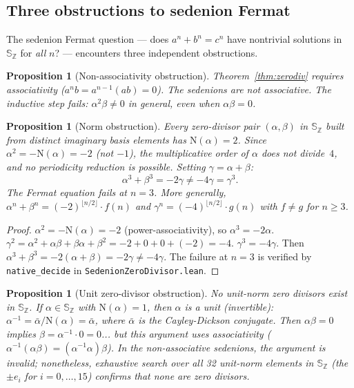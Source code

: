 \documentclass[11pt]{amsart}
\theoremstyle{plain}
\newtheorem{proposition}[theorem]{Proposition}
\theoremstyle{definition}
\theoremstyle{remark}
\newcommand{\Z}{\mathbb{Z}}
\newcommand{\Se}{\mathbb{S}}
\newcommand{\Norm}[1]{\mathrm{N}(#1)}
\begin{document}
\subsection{Three obstructions to sedenion Fermat}

The sedenion Fermat question --- does $a^n + b^n = c^n$ have nontrivial
solutions in $\Se_\Z$ for \emph{all} $n$? --- encounters three independent
obstructions.

\begin{proposition}[Non-associativity obstruction]\label{prop:nonassoc}
Theorem~\ref{thm:zerodiv} requires associativity ($a^n b = a^{n-1}(ab) = 0$).
The sedenions are not associative. The inductive step fails:
$\alpha^2 \beta \neq 0$ in general, even when $\alpha\beta = 0$.
\end{proposition}

\begin{proposition}[Norm obstruction]\label{prop:normobs}
Every zero-divisor pair $(\alpha, \beta)$ in $\Se_\Z$ built from
distinct imaginary basis elements has $\Norm{\alpha} = 2$.
Since $\alpha^2 = -\Norm{\alpha} = -2$ (not $-1$), the multiplicative
order of $\alpha$ does not divide~$4$, and no periodicity reduction is possible.
Setting $\gamma = \alpha + \beta$:
\[
  \alpha^3 + \beta^3 = -2\gamma \neq -4\gamma = \gamma^3.
\]
The Fermat equation fails at $n = 3$.
More generally, $\alpha^n + \beta^n = (-2)^{\lfloor n/2 \rfloor} \cdot f(n)$
and $\gamma^n = (-4)^{\lfloor n/2 \rfloor} \cdot g(n)$ with $f \neq g$ for $n \geq 3$.
\end{proposition}

\begin{proof}
$\alpha^2 = -\Norm{\alpha} = -2$ (power-associativity), so $\alpha^3 = -2\alpha$.
$\gamma^2 = \alpha^2 + \alpha\beta + \beta\alpha + \beta^2 = -2 + 0 + 0 + (-2) = -4$.
$\gamma^3 = -4\gamma$. Then $\alpha^3 + \beta^3 = -2(\alpha + \beta) = -2\gamma \neq -4\gamma$.
The failure at $n = 3$ is verified by \texttt{native\_decide}
in \texttt{SedenionZeroDivisor.lean}.
\end{proof}

\begin{proposition}[Unit zero-divisor obstruction]\label{prop:unitzd}
No unit-norm zero divisors exist in $\Se_\Z$.
If $\alpha \in \Se_\Z$ with $\Norm{\alpha} = 1$, then $\alpha$ is a unit
(invertible): $\alpha^{-1} = \bar\alpha / \Norm{\alpha} = \bar\alpha$,
where $\bar\alpha$ is the Cayley-Dickson conjugate. Then $\alpha\beta = 0$
implies $\beta = \alpha^{-1} \cdot 0 = 0$... \emph{but this argument uses
associativity} ($\alpha^{-1}(\alpha\beta) = (\alpha^{-1}\alpha)\beta$).
In the non-associative sedenions, the argument is invalid;
nonetheless, exhaustive search over all 32 unit-norm elements in $\Se_\Z$
(the $\pm e_i$ for $i = 0, \ldots, 15$) confirms
that none are zero divisors.
\end{proposition}
\end{document}
